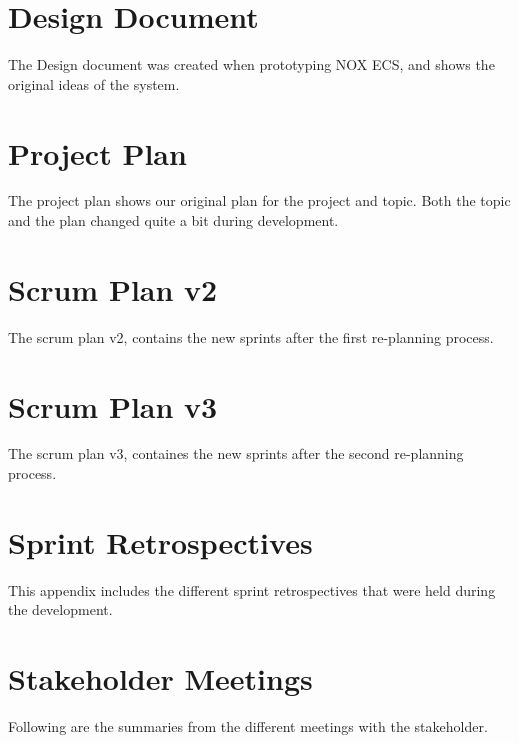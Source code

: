 \documentclass[BSP,english,oneside]{ntnuthesis/ntnubachelorthesis}
\begin{document}
\chapter{Design Document}
\label{chap:appendix_design_document}
The Design document was created when prototyping NOX ECS, and shows the original ideas of the system.


\chapter{Project Plan}
\label{chap:appendix_project_plan}
The project plan shows our original plan for the project and topic. Both the topic and the plan changed
quite a bit during development.


\chapter{Scrum Plan v2}
\label{chap:appendix_scrum_plan_v2}
The scrum plan v2, contains the new sprints after the first re-planning process.


\chapter{Scrum Plan v3}
\label{chap:appendix_scrum_plan_v3}
The scrum plan v3, containes the new sprints after the second re-planning process.


\chapter{Sprint Retrospectives}
\label{chap:appendix_sprint_retrospectives}
This appendix includes the different sprint retrospectives that were held during the development.






\chapter{Stakeholder Meetings}
\label{chap:appendix_stakeholder_meetings}
Following are the summaries from the different meetings with the stakeholder.




\end{document}
